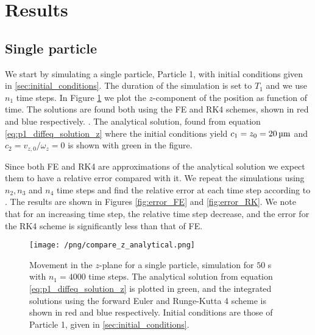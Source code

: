 \section{Results}\label{sec:results}

\subsection{Single particle}\label{sec:one_particle}
We start by simulating a single particle, Particle 1, with initial conditions given in \ref{sec:initial_conditions}. The duration of the simulation is set to $T_1$ and we use $n_1$ time steps. In Figure \ref{fig:compare_z_analytical} we plot the $z$-component of the position as function of time. The solutions are found both using the FE and RK4 schemes, shown in red and blue respectively.  . The analytical solution, found from equation \eqref{eq:p1_diffeq_solution_z} where the initial conditions yield $c_1 = z_0 = 20\,\mathrm{\text{\textmu}m}$ and $c_2 = v_{z,0}/\omega_z= 0$ is shown with green in the figure.

Since both FE and RK4 are approximations of the analytical solution we expect them to have a relative error compared with it. We repeat the simulations using $n_2, n_3$ and $n_4$ time steps and find the relative error at each time step according to . The results are shown in Figures \ref{fig:error_FE} and \ref{fig:error_RK}. We note that for an increasing time step, the relative time step decrease, and the error for the RK4 scheme is significantly less than that of FE. 

\begin{figure}
    \texttt{[image: /png/compare\_z\_analytical.png]}
    \caption{Movement in the $z$-plane for a single particle, simulation for $50$ \textmu s with $n_1=4000$ time steps. The analytical solution from equation \eqref{eq:p1_diffeq_solution_z} is plotted in green, and the integrated solutions using the forward Euler and Runge-Kutta 4 scheme is shown in red and blue respectively. Initial conditions are those of Particle 1, given in \ref{sec:initial_conditions}.}
    \label{fig:compare_z_analytical}
\end{figure}


